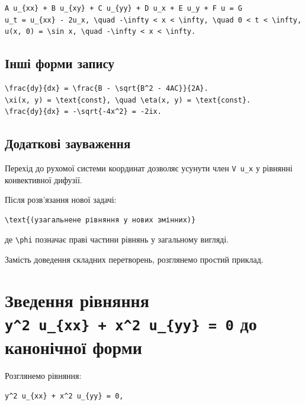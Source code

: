 \documentclass[
  ukrainian,
]{article}
\begin{document}
\begin{verbatim}
A u_{xx} + B u_{xy} + C u_{yy} + D u_x + E u_y + F u = G
u_t = u_{xx} - 2u_x, \quad -\infty < x < \infty, \quad 0 < t < \infty,
u(x, 0) = \sin x, \quad -\infty < x < \infty.
\end{verbatim}

\subsection{Інші форми
запису}\label{ux456ux43dux448ux456-ux444ux43eux440ux43cux438-ux437ux430ux43fux438ux441ux443}

\begin{verbatim}
\frac{dy}{dx} = \frac{B - \sqrt{B^2 - 4AC}}{2A}.
\xi(x, y) = \text{const}, \quad \eta(x, y) = \text{const}.
\frac{dy}{dx} = -\sqrt{-4x^2} = -2ix.
\end{verbatim}

\subsection{Додаткові
зауваження}\label{ux434ux43eux434ux430ux442ux43aux43eux432ux456-ux437ux430ux443ux432ux430ux436ux435ux43dux43dux44f}

Перехід до рухомої системи координат дозволяє усунути член
\texttt{V\ u\_x} у рівнянні конвективної дифузії.

Після розв'язання нової задачі:

\begin{verbatim}
\text{(узагальнене рівняння у нових змінних)}
\end{verbatim}

де \texttt{\textbackslash{}phi} позначає праві частини рівнянь у
загальному вигляді.

Замість доведення складних перетворень, розглянемо простий приклад.

\section{\texorpdfstring{Зведення рівняння
\texttt{y\^{}2\ u\_\{xx\}\ +\ x\^{}2\ u\_\{yy\}\ =\ 0} до канонічної
форми}{Зведення рівняння y\^{}2 u\_\{xx\} + x\^{}2 u\_\{yy\} = 0 до канонічної форми}}\label{ux437ux432ux435ux434ux435ux43dux43dux44f-ux440ux456ux432ux43dux44fux43dux43dux44f-y2-u_xx-x2-u_yy-0-ux434ux43e-ux43aux430ux43dux43eux43dux456ux447ux43dux43eux457-ux444ux43eux440ux43cux438}

Розглянемо рівняння:

\begin{verbatim}
y^2 u_{xx} + x^2 u_{yy} = 0,
\end{verbatim}
\end{document}
